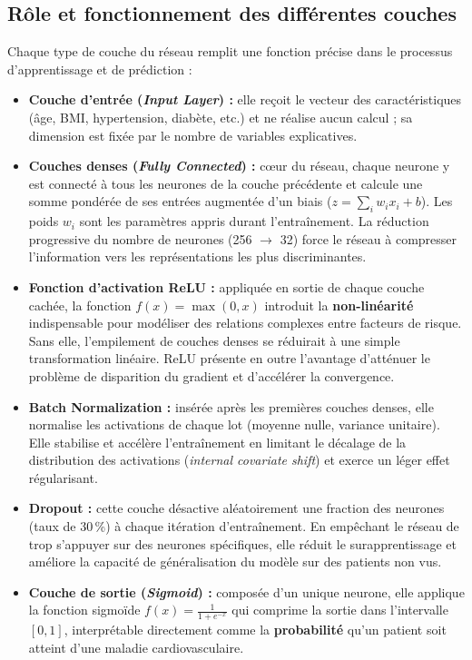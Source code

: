 \documentclass[12pt,a4paper]{report}
\begin{document}
\subsection{Rôle et fonctionnement des différentes couches}

Chaque type de couche du réseau remplit une fonction précise dans le processus
d'apprentissage et de prédiction :

\begin{itemize}
  \item \textbf{Couche d'entrée (\textit{Input Layer}) :} elle reçoit le vecteur des
    caractéristiques (âge, BMI, hypertension, diabète, etc.) et ne réalise aucun
    calcul ; sa dimension est fixée par le nombre de variables explicatives.

  \item \textbf{Couches denses (\textit{Fully Connected}) :} c\oe{}ur du réseau,
    chaque neurone y est connecté à tous les neurones de la couche précédente et
    calcule une somme pondérée de ses entrées augmentée d'un biais
    ($z = \sum_i w_i x_i + b$). Les poids $w_i$ sont les paramètres appris durant
    l'entraînement. La réduction progressive du nombre de neurones
    (256 $\rightarrow$ 32) force le réseau à compresser l'information vers les
    représentations les plus discriminantes.

  \item \textbf{Fonction d'activation ReLU :} appliquée en sortie de chaque couche
    cachée, la fonction $f(x)=\max(0,x)$ introduit la \textbf{non-linéarité}
    indispensable pour modéliser des relations complexes entre facteurs de risque.
    Sans elle, l'empilement de couches denses se réduirait à une simple transformation
    linéaire. ReLU présente en outre l'avantage d'atténuer le problème de disparition
    du gradient et d'accélérer la convergence.

  \item \textbf{Batch Normalization :} insérée après les premières couches denses,
    elle normalise les activations de chaque lot (moyenne nulle, variance unitaire).
    Elle stabilise et accélère l'entraînement en limitant le décalage de la
    distribution des activations (\textit{internal covariate shift}) et exerce un
    léger effet régularisant.

  \item \textbf{Dropout :} cette couche désactive aléatoirement une fraction des
    neurones (taux de 30\,\%) à chaque itération d'entraînement. En empêchant le
    réseau de trop s'appuyer sur des neurones spécifiques, elle réduit le
    surapprentissage et améliore la capacité de généralisation du modèle sur des
    patients non vus.

  \item \textbf{Couche de sortie (\textit{Sigmoid}) :} composée d'un unique neurone,
    elle applique la fonction sigmoïde $f(x)=\frac{1}{1+e^{-x}}$ qui comprime la
    sortie dans l'intervalle $[0,1]$, interprétable directement comme la
    \textbf{probabilité} qu'un patient soit atteint d'une maladie cardiovasculaire.
\end{itemize}
\end{document}
